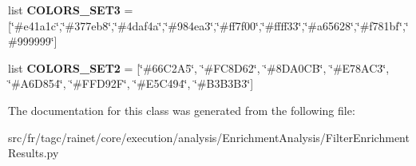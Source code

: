 \begin{DoxyCompactItemize}
\item 
\hypertarget{classsrc_1_1fr_1_1tagc_1_1rainet_1_1core_1_1execution_1_1analysis_1_1EnrichmentAnalysis_1_1Filte941a9d7a59dd1ff35f69bc40c53c882a_a91e888067eb26903db6931bf32795c89}{list {\bfseries C\-O\-L\-O\-R\-S\-\_\-\-S\-E\-T3} = \mbox{[}\char`\"{}\#e41a1c\char`\"{},\char`\"{}\#377eb8\char`\"{},\char`\"{}\#4daf4a\char`\"{},\char`\"{}\#984ea3\char`\"{},\char`\"{}\#ff7f00\char`\"{},\char`\"{}\#ffff33\char`\"{},\char`\"{}\#a65628\char`\"{},\char`\"{}\#f781bf\char`\"{},\char`\"{}\#999999\char`\"{}\mbox{]}}\label{classsrc_1_1fr_1_1tagc_1_1rainet_1_1core_1_1execution_1_1analysis_1_1EnrichmentAnalysis_1_1Filte941a9d7a59dd1ff35f69bc40c53c882a_a91e888067eb26903db6931bf32795c89}

\item 
\hypertarget{classsrc_1_1fr_1_1tagc_1_1rainet_1_1core_1_1execution_1_1analysis_1_1EnrichmentAnalysis_1_1Filte941a9d7a59dd1ff35f69bc40c53c882a_ae8c62f1e74bc1f404cd69dae567ef8b1}{list {\bfseries C\-O\-L\-O\-R\-S\-\_\-\-S\-E\-T2} = \mbox{[}\char`\"{}\#66\-C2\-A5\char`\"{}, \char`\"{}\#\-F\-C8\-D62\char`\"{}, \char`\"{}\#8\-D\-A0\-C\-B\char`\"{}, \char`\"{}\#\-E78\-A\-C3\char`\"{}, \char`\"{}\#\-A6\-D854\char`\"{}, \char`\"{}\#\-F\-F\-D92\-F\char`\"{}, \char`\"{}\#\-E5\-C494\char`\"{}, \char`\"{}\#\-B3\-B3\-B3\char`\"{}\mbox{]}}\label{classsrc_1_1fr_1_1tagc_1_1rainet_1_1core_1_1execution_1_1analysis_1_1EnrichmentAnalysis_1_1Filte941a9d7a59dd1ff35f69bc40c53c882a_ae8c62f1e74bc1f404cd69dae567ef8b1}

\end{DoxyCompactItemize}


The documentation for this class was generated from the following file\-:\begin{DoxyCompactItemize}
\item 
src/fr/tagc/rainet/core/execution/analysis/\-Enrichment\-Analysis/Filter\-Enrichment\-Results.\-py\end{DoxyCompactItemize}
